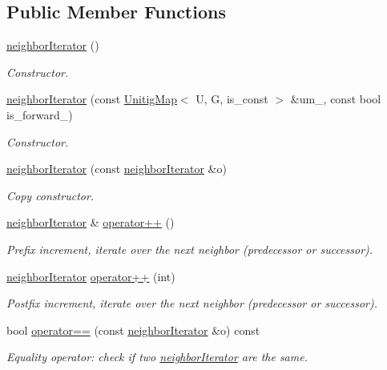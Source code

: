 \subsection*{Public Member Functions}
\begin{DoxyCompactItemize}
\item 
\hyperlink{classneighborIterator_ab857cd8f2e6bb98f844d9316c8e8d5b5}{neighbor\+Iterator} ()
\begin{DoxyCompactList}\small\item\em Constructor. \end{DoxyCompactList}\item 
\hyperlink{classneighborIterator_a3a524d5ee6219ea7ccc3a11f69d80835}{neighbor\+Iterator} (const \hyperlink{classUnitigMap}{Unitig\+Map}$<$ U, G, is\+\_\+const $>$ \&um\+\_\+, const bool is\+\_\+forward\+\_\+)
\begin{DoxyCompactList}\small\item\em Constructor. \end{DoxyCompactList}\item 
\hyperlink{classneighborIterator_ad7ee6efe87e4c4619c96e6c4fae809df}{neighbor\+Iterator} (const \hyperlink{classneighborIterator}{neighbor\+Iterator} \&o)
\begin{DoxyCompactList}\small\item\em Copy constructor. \end{DoxyCompactList}\item 
\hyperlink{classneighborIterator}{neighbor\+Iterator} \& \hyperlink{classneighborIterator_aa84a0c4942e9a9ba2245eb2572205c66}{operator++} ()
\begin{DoxyCompactList}\small\item\em Prefix increment, iterate over the next neighbor (predecessor or successor). \end{DoxyCompactList}\item 
\hyperlink{classneighborIterator}{neighbor\+Iterator} \hyperlink{classneighborIterator_a508d1dccf8281fed8abd8aaefb145570}{operator++} (int)
\begin{DoxyCompactList}\small\item\em Postfix increment, iterate over the next neighbor (predecessor or successor). \end{DoxyCompactList}\item 
bool \hyperlink{classneighborIterator_a039b30193aefde354eba133a55263b51}{operator==} (const \hyperlink{classneighborIterator}{neighbor\+Iterator} \&o) const
\begin{DoxyCompactList}\small\item\em Equality operator\+: check if two \hyperlink{classneighborIterator}{neighbor\+Iterator} are the same. \end{DoxyCompactList}\item 

\end{DoxyCompactItemize}
